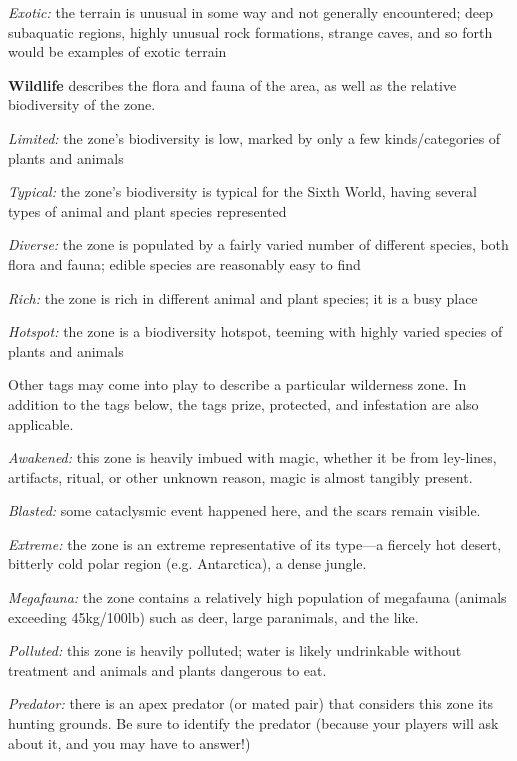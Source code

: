 \documentclass[oneside,10pt]{article}
\begin{document}
\begin{multicols}{2}
\begin{adjustwidth*}{.5cm}{.5cm}
\textit{Exotic:} the terrain is unusual in some way and not generally encountered; deep subaquatic regions, highly unusual
rock formations, strange caves, and so forth would be examples of exotic terrain
\end{adjustwidth*}

\textbf{Wildlife} describes the flora and fauna of the area, as well as
the relative biodiversity of the zone.
\begin{adjustwidth*}{.5cm}{.5cm}

\textit{Limited:} the zone’s biodiversity is low, marked by only a
few kinds/categories of plants and animals

\textit{Typical:} the zone’s biodiversity is typical for the Sixth
World, having several types of animal and plant species
represented

\textit{Diverse:} the zone is populated by a fairly varied number of
different species, both flora and fauna; edible species are
reasonably easy to find

\textit{Rich:} the zone is rich in different animal and plant species;
it is a busy place

\textit{Hotspot:} the zone is a biodiversity hotspot, teeming with
highly varied species of plants and animals
\end{adjustwidth*}

Other tags may come into play to describe a particular wilderness zone. In addition to the tags below, the tags prize,
protected, and infestation are also applicable.
\begin{adjustwidth*}{.5cm}{.5cm}

\textit{Awakened:} this zone is heavily imbued with magic, whether it be from ley-lines, artifacts, ritual, or other unknown
reason, magic is almost tangibly present.

\textit{Blasted:} some cataclysmic event happened here, and the
scars remain visible.

\textit{Extreme:} the zone is an extreme representative of its
type—a fiercely hot desert, bitterly cold polar region (e.g.
 Antarctica), a dense jungle.

\textit{Megafauna:} the zone contains a relatively high population
of megafauna (animals exceeding 45kg/100lb) such as
deer, large paranimals, and the like.

\textit{Polluted:} this zone is heavily polluted; water is likely undrinkable without treatment and animals and plants dangerous to eat.

\textit{Predator:} there is an apex predator (or mated pair) that
considers this zone its hunting grounds. Be sure to identify
the predator (because your players will ask about it, and
you may have to answer!)


\end{adjustwidth*}
\end{multicols}
\end{document}
